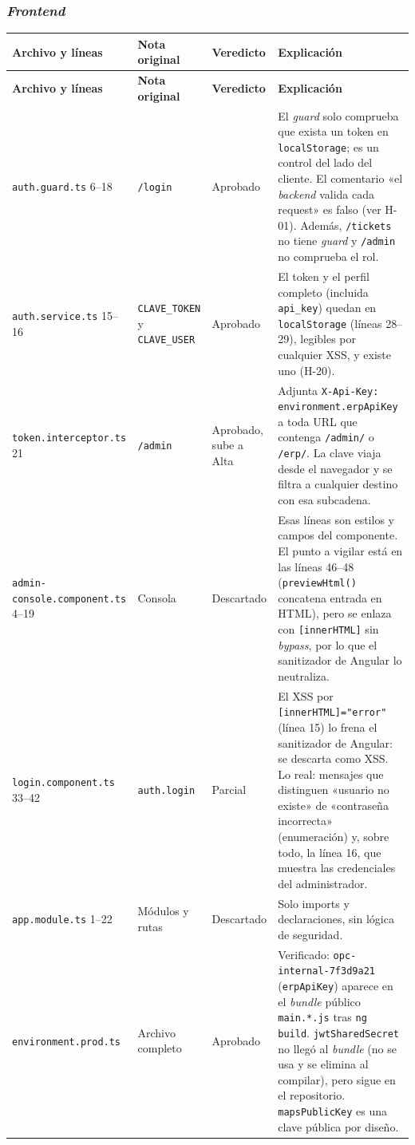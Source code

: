 \documentclass[11pt,letterpaper]{article}
\newcommand{\f}[1]{\texttt{#1}}
\newcommand{\enc}[1]{\textbf{#1}}
\begin{document}
\subsubsection*{\textit{Frontend}}
\begin{small}
\begin{longtable}{p{3.2cm}p{2.3cm}p{2.3cm}p{7.4cm}}
\toprule
\enc{Archivo y líneas} & \enc{Nota original} & \enc{Veredicto} & \enc{Explicación} \\
\midrule
\endfirsthead
\toprule
\enc{Archivo y líneas} & \enc{Nota original} & \enc{Veredicto} & \enc{Explicación} \\
\midrule
\endhead
\bottomrule
\endfoot
\f{auth.guard.ts} 6--18 & \f{/login} & Aprobado & El \textit{guard} solo comprueba que exista un token en \f{localStorage}; es un control del lado del cliente. El comentario «el \textit{backend} valida cada request» es falso (ver H-01). Además, \f{/tickets} no tiene \textit{guard} y \f{/admin} no comprueba el rol. \\
\f{auth.service.ts} 15--16 & \f{CLAVE\_TOKEN} y \f{CLAVE\_USER} & Aprobado & El token y el perfil completo (incluida \f{api\_key}) quedan en \f{localStorage} (líneas 28--29), legibles por cualquier XSS, y existe uno (H-20). \\
\f{token.interceptor.ts} 21 & \f{/admin} & Aprobado, sube a Alta & Adjunta \f{X-Api-Key: environment.erpApiKey} a toda URL que contenga \f{/admin/} o \f{/erp/}. La clave viaja desde el navegador y se filtra a cualquier destino con esa subcadena. \\
\f{admin-console.component.ts} 4--19 & Consola & Descartado & Esas líneas son estilos y campos del componente. El punto a vigilar está en las líneas 46--48 (\f{previewHtml()} concatena entrada en HTML), pero se enlaza con \f{[innerHTML]} sin \textit{bypass}, por lo que el sanitizador de Angular lo neutraliza. \\
\f{login.component.ts} 33--42 & \f{auth.login} & Parcial & El XSS por \f{[innerHTML]="error"} (línea 15) lo frena el sanitizador de Angular: se descarta como XSS. Lo real: mensajes que distinguen «usuario no existe» de «contraseña incorrecta» (enumeración) y, sobre todo, la línea 16, que muestra las credenciales del administrador. \\
\f{app.module.ts} 1--22 & Módulos y rutas & Descartado & Solo imports y declaraciones, sin lógica de seguridad. \\
\f{environment.prod.ts} & Archivo completo & Aprobado & Verificado: \f{opc-internal-7f3d9a21} (\f{erpApiKey}) aparece en el \textit{bundle} público \f{main.*.js} tras \f{ng build}. \f{jwtSharedSecret} no llegó al \textit{bundle} (no se usa y se elimina al compilar), pero sigue en el repositorio. \f{mapsPublicKey} es una clave pública por diseño. \\

\end{longtable}
\end{small}
\end{document}

